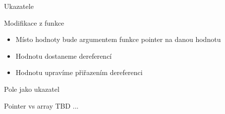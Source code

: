 \documentclass[9pt]{beamer}
\begin{document}
\begin{frame}{Ukazatele}
    \begin{block}{Modifikace z funkce}
        \begin{itemize}
            \item Místo hodnoty bude argumentem funkce pointer na danou hodnotu
            \item Hodnotu dostaneme dereferencí
            \item Hodnotu upravíme přiřazením dereferenci
        \end{itemize}
    \end{block}
    
\end{frame}

\begin{frame}{Pole jako ukazatel}
    \begin{block}{Pointer vs array}
        TBD ...
    \end{block}
\end{frame}
\end{document}
